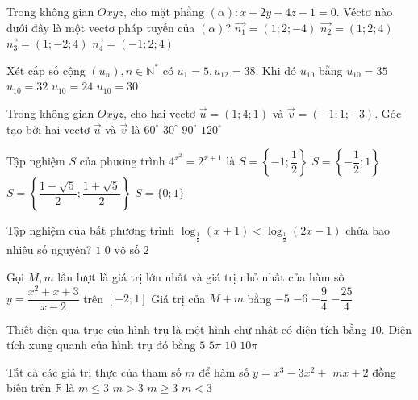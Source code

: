 \begin{ex}%
Trong không gian $O x y z$, cho mặt phẳng $(\alpha)\colon x-2 y+4 z-1=0$. Véctơ nào dưới đây là một vectơ pháp tuyến của $(\alpha)$?
\choice
{$\overrightarrow{n_1}=(1; 2;-4)$}
{$\overrightarrow{n_2}=(1; 2; 4)$}
{\True $\overrightarrow{n_3}=(1;-2; 4)$}
{$\overrightarrow{n_4}=(-1; 2; 4)$}

\end{ex}
\begin{ex}%
Xét cấp số cộng $\left(u_n\right), n \in \mathbb{N}^{*}$ có $u_1=5, u_{12}=38$. Khi đó $u_{10}$ bẵng
\choice
{$u_{10}=35$}
{\True $u_{10}=32$}
{$u_{10}=24$}
{$u_{10}=30$}

\end{ex}
\begin{ex}%
Trong không gian $O x y z$, cho hai vectơ $\vec{u}=(1; 4; 1)$ và $\vec{v}=(-1; 1;-3)$. Góc tạo bởi hai vectơ $\vec{u}$ và $\vec{v}$ là
\choice
{$60^{\circ}$}
{$30^{\circ}$}
{\True $90^{\circ}$}
{$120^{\circ}$}

\end{ex}
\begin{ex}%
Tập nghiệm $S$ của phương trình $4^{x^2}=2^{x+1}$ là
\choice
{$S=\left\{-1; \dfrac{1}{2}\right\}$}
{\True $S=\left\{-\dfrac{1}{2}; 1\right\}$}
{$S=\left\{\dfrac{1-\sqrt{5}}{2}; \dfrac{1+\sqrt{5}}{2}\right\}$}
{$S=\{0; 1\}$}

\end{ex}
\begin{ex}%
Tập nghiệm của bất phương trình $\log_{\frac{1}{2}}(x+1)<\log_{\frac{1}{2}}(2 x-1)$ chứa bao nhiêu số nguyên?
\choice
{\True $1$}
{$0$}
{$\text{vô số}$}
{$2$}

\end{ex}
\begin{ex}%
Gọi $M, m$ lần lượt là giá trị lớn nhất và giá trị nhỏ nhất của hàm số $y=\dfrac{x^2+x+3}{x-2}$ trên $[-2; 1]$ Giá trị của $M+m$ bằng
\choice
{$-5$}
{\True $-6$}
{$-\dfrac{9}{4}$}
{$-\dfrac{25}{4}$}

\end{ex}
\begin{ex}%
Thiết diện qua trục của hình trụ là một hình chữ nhật có diện tích bằng $10$. Diện tích xung quanh của hình trụ đó bằng
\choice
{$5$}
{$5\pi$}
{$10$}
{\True $10\pi$}

\end{ex}
\begin{ex}%
Tất cả các giá trị thực của tham số $m$ để hàm số $y=x^3-3 x^2+$ $m x+2$ đồng biến trên $\mathbb{R}$ là
\choice
{$m \leq 3$}
{$m>3$}
{\True $m \geq 3$}
{$m<3$}

\end{ex}
